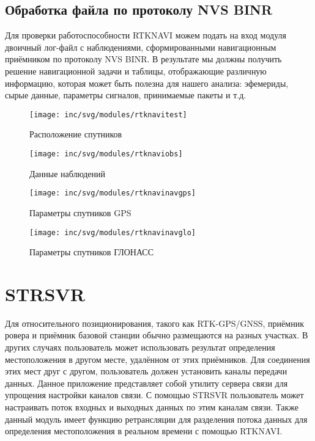 \subsection{Обработка файла по протоколу NVS BINR}
Для проверки работоспособности RTKNAVI можем подать на вход модуля двоичный лог-файл с наблюдениями, сформированными навигационным приёмником по протоколу NVS BINR. В результате мы должны получить решение навигационной задачи и таблицы, отображающие различную информацию, которая может быть полезна для нашего анализа: эфемериды, сырые данные, параметры сигналов, принимаемые пакеты и т.д.
\begin{figure}[h!]
	\centering
	\texttt{[image: inc/svg/modules/rtknavitest]}
	\caption{Расположение спутников}
	\label{fig:rtknavitest}
\end{figure}
\begin{figure}[h!]
	\centering
	\texttt{[image: inc/svg/modules/rtknaviobs]}
	\caption{Данные наблюдений}
	\label{fig:rtknaviobs}
\end{figure}
\begin{figure}[h!]
	\centering
	\texttt{[image: inc/svg/modules/rtknavinavgps]}
	\caption{Параметры спутников GPS}
	\label{fig:rtknavinavgps}
\end{figure}
\newpage
\begin{figure}[h!]
	\centering
	\texttt{[image: inc/svg/modules/rtknavinavglo]}
	\caption{Параметры спутников ГЛОНАСС}
	\label{fig:rtknavinavglo}
\end{figure}
\section{STRSVR}
Для относительного позиционирования, такого как RTK-GPS/GNSS, приёмник ровера и приёмник базовой станции обычно размещаются на разных участках. В других случаях пользователь может использовать результат определения местоположения в другом месте, удалённом от этих приёмников. Для соединения этих мест друг с другом, пользователь должен установить каналы передачи данных. Данное приложение представляет собой утилиту сервера связи для упрощения настройки каналов связи. С помощью STRSVR пользователь может настраивать поток входных и выходных данных по этим каналам связи. Также данный модуль имеет функцию ретрансляции для разделения потока данных для определения местоположения в реальном времени с помощью RTKNAVI.


